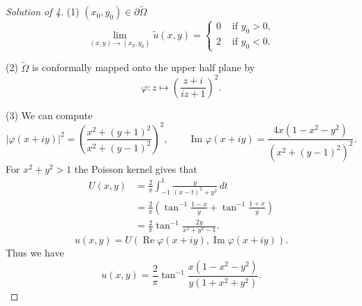 \documentclass[a4paper]{article}
\theoremstyle{definition}
\renewcommand{\Re}{\operatorname{Re}}
\renewcommand{\Im}{\operatorname{Im}}
\newcommand{\f}{\varphi}
\renewcommand{\tilde}{\widetilde}
\begin{document}
\newpage
\begin{proof}[Solution of 4]
(1)
$(x_0,y_0)\in\partial\tilde\Omega$
\[\lim_{(x,y)\to(x_0,y_0)}\tilde u(x,y)=\begin{cases}
0&\text{ if }y_0>0,\\
2&\text{ if }y_0<0.
\end{cases}\]

(2)
$\tilde\Omega$ is conformally mapped onto the upper half plane by
\[\f:z\mapsto\left(\frac{z+i}{iz+1}\right)^2.\]

(3)
We can compute
\[|\f(x+iy)|^2=\left(\frac{x^2+(y+1)^2}{x^2+(y-1)^2}\right)^2,\qquad\Im\f(x+iy)=\frac{4x(1-x^2-y^2)}{(x^2+(y-1)^2)^2}.\]
For $x^2+y^2>1$ the Poisson kernel gives that
\begin{align*}
U(x,y)
&=\frac2\pi\int_{-1}^1\frac y{(x-t)^2+y^2}\,dt\\
&=\frac2\pi\left(\tan^{-1}\frac{1-x}y+\tan^{-1}\frac{1+x}y\right)\\
&=\frac2\pi\tan^{-1}\frac{2y}{x^2+y^2-1}.
\end{align*}
\[u(x,y)=U(\Re\f(x+iy),\Im\f(x+iy)).\]
Thus we have
\[u(x,y)=\frac2\pi\tan^{-1}\frac{x(1-x^2-y^2)}{y(1+x^2+y^2)}.\]
\end{proof}
\end{document}
